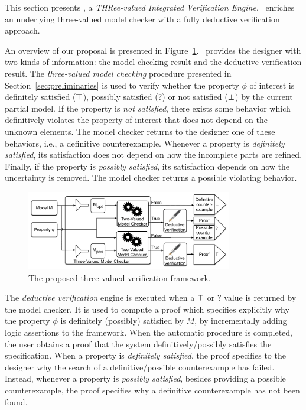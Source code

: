 This section presents \NAME, a \emph{THRee-valued Integrated Verification Engine}. 
\NAME\ enriches an underlying three-valued model checker with a fully deductive verification approach.

\setcounter{footnote}{0}

An overview of our proposal is presented in Figure~\ref{Fig.3vdv}.
\NAME\ provides the designer with two kinds of information: the model checking result and the deductive verification result.
The \emph{three-valued model checking} procedure presented in Section~\ref{sec:preliminaries} is used to verify whether the property $\phi$ of interest is definitely satisfied ($\operatorname{\top}$), possibly satisfied ($?$) or not satisfied ($\operatorname{\bot}$) by the current partial model. 
If the property is \emph{not satisfied}, there exists some behavior which definitively violates the property of interest that does not depend on the unknown elements.
The model checker returns to the designer one of these behaviors, i.e., a definitive counterexample. 
Whenever a property is \emph{definitely satisfied}, its satisfaction does not depend on how the incomplete parts are refined.
Finally, if the property is \emph{possibly satisfied}, its satisfaction depends on how the uncertainty is removed.
The model checker returns a possible violating behavior.

\begin{figure}[b]
\begin{center}         
\includegraphics[width=9cm]{./images/atvaFig.pdf}
\end{center}
\caption{The proposed three-valued verification framework.}  
\label{Fig.3vdv}
\end{figure}


The \emph{deductive verification} engine is executed when a $\operatorname{\top}$ or $?$ value is returned by the model checker.
It is used to compute a proof which specifies explicitly why the property $\phi$ is definitely (possibly) satisfied by $M$, by incrementally adding logic assertions to the framework. 
When the automatic procedure is completed, the user obtains a proof that the system definitively/possibly satisfies the specification.
When a property is \emph{definitely satisfied}, the proof specifies to the designer why the search of a definitive/possible counterexample has failed.
Instead, whenever a property is \emph{possibly satisfied}, besides providing a possible counterexample, the proof specifies why a definitive counterexample has not been found.

